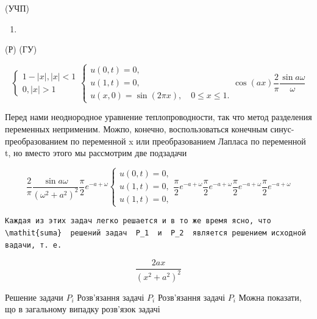 \documentclass[
  ukrainian,
]{article}
\providecommand{\tightlist}{%
  \setlength{\itemsep}{0pt}\setlength{\parskip}{0pt}}
\begin{document}
(УЧП)

\begin{enumerate}
\def\labelenumi{\arabic{enumi}.}
\setcounter{enumi}{17}
\tightlist
\item
\end{enumerate}

(Р) (ГУ)

\[
\begin{cases} 1-|x|, |x| < 1 \\ 0, |x| > 1 \end{cases}
\begin{cases} u(0, t) = 0, \\ u(1, t) = 0, \\ u(x, 0) = \sin(2\pi x), \quad 0 \le x \le 1. \end{cases}
\cos(ax)
\frac{2}{\pi} \frac{\sin a\omega}{\omega}
\]

Перед нами неоднородное уравнение теплопроводности, так что метод
разделения переменных неприменим. Можпо, конечно, воспользоваться
конечным синус-преобразованием по переменной x или преобразованием
Лапласа по переменной t, но вместо этого мы рассмотрим две подзадачи

\[
\frac{2}{\pi} \frac{\sin a\omega}{(\omega^2+a^2)^2}
\frac{\pi}{2} e^{-a+\omega}
\begin{cases} u(0, t) = 0, \\ u(1, t) = 0, \\ u(1, t) = 0, \end{cases}
\frac{\pi}{2} e^{-a+\omega}
\frac{\pi}{2} e^{-a+\omega}
\frac{\pi}{2} e^{-a+\omega}
\frac{\pi}{2} e^{-a+\omega}
\]

\begin{verbatim}
Каждая из этих задач легко решается и в то же время ясно, что  \mathit{suma}  решений задач  P_1  и  P_2  является решением исходной вадачи, т. е.
\end{verbatim}

\[
\frac{2ax}{(x^2+a^2)^2}
\]

Решение задачи \(P_{i}\) Розв'язання задачі \(P_i\) Розв'язання задачі
\(P_i\) Можна показати, що в загальному випадку розв'язок задачі
\end{document}
